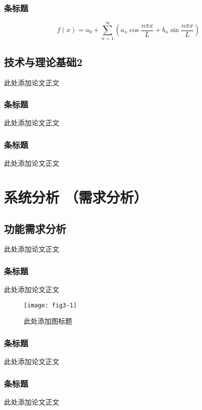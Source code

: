 \documentclass{article}
\begin{document}
\subsubsection{条标题}

\begin{equation}
f(x)=a_0+\sum_{n=1}^{\infty}\left( a_n \cos \frac{n\pi x}{L}+b_n \sin \frac{n\pi x}{L}  \right)
\end{equation}

\subsection{技术与理论基础2}
此处添加论文正文

\subsubsection{条标题}
此处添加论文正文

\subsubsection{条标题}
此处添加论文正文


\section{系统分析 （需求分析）}

\subsection{功能需求分析}
此处添加论文正文

\subsubsection{条标题}
此处添加论文正文

\begin{figure}[H]
\centering
\texttt{[image: fig3-1]}
\caption{此处添加图标题}\label{fig3-1}
\end{figure}

\subsubsection{条标题}
此处添加论文正文

\subsubsection{条标题}
此处添加论文正文
\end{document}
